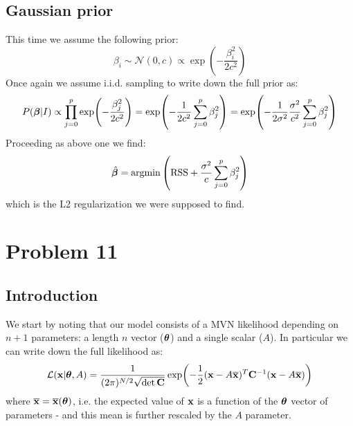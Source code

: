 \documentclass[a4paper]{article}
\newcommand{\mat}[1]{\vb{#1}}
\newcommand{\tonde}[1]{\left( {#1} \right)}
\renewcommand{\L}{\mathcal{L}}%
\begin{document}
\subsection{Gaussian prior}
This time we assume the following prior:
\begin{equation*}
    \beta_i \sim \mathcal{N}(0,c) \propto \exp(-\frac{\beta_i^2}{2c^2})
\end{equation*}
Once again we assume i.i.d. sampling to write down the full prior as:
\begin{equation*}
    P(\vb*{\beta}|I) \propto \prod_{j=0}^p \exp(-\frac{\beta_j^2}{2c^2}) = \exp(-\frac{1}{2c^2}\sum_{j=0}^p \beta_j^2) = \exp(-\frac{1}{2\sigma^2} \frac{\sigma^2}{c^2}\sum_{j=0}^p \beta_j^2)
\end{equation*}
Proceeding as above one we find:
\begin{equation*}
    \hat{\vb*{\beta}} = \text{argmin} \tonde{\text{RSS} + \frac{\sigma^2}{c}\sum_{j=0}^p \beta_j^2}
\end{equation*}
which is the L2 regularization we were supposed to find.


\section{Problem 11}
\subsection{Introduction}
We start by noting that our model consists of a MVN likelihood depending on $n+1$ parameters: a length $n$ vector ($\vb*{\theta}$) and a single scalar ($A$). In particular we can write down the full likelihood as:
\begin{equation*}
    \L(\vb{x}|\vb*{\theta}, A) = \frac{1}{(2\pi)^{N/2}\sqrt{\det \mat{C}}}\exp(-\frac{1}{2}(\vb{x} - A\overline{\vb{x}})^T \mat{C}^{-1}(\vb{x} - A\overline{\vb{x}}))
\end{equation*}
where $\overline{\vb{x}} = \overline{\vb{x}}(\vb*{\theta})$, i.e. the expected value of $\vb{x}$ is a function of the $\vb*{\theta}$ vector of parameters - and this mean is further rescaled by the $A$ parameter.
\end{document}
